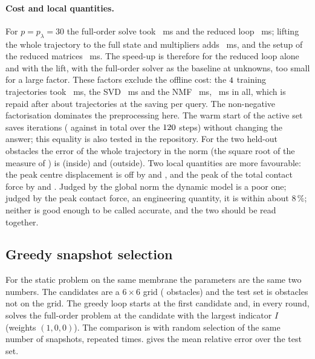 \paragraph{Cost and local quantities.} For $p=p_\lambda=30$ the full-order solve took \chdTimeFom~ms and the reduced loop \chdTimeRom~ms; lifting the whole trajectory to the full state and multipliers adds \chdTimeLift~ms, and the setup of the reduced matrices \chdTimeSetup~ms. The speed-up is therefore \chdSpeed{} for the reduced loop alone and \chdSpeedLift{} with the lift, with the full-order solver as the baseline at \chdN{} unknowns, too small for a large factor. These factors exclude the offline cost: the $4$ training trajectories took \chdTimeTrajs~ms, the SVD \chdTimeSvd~ms and the NMF \chdTimeNmf~ms, \chdTimeOffline~ms in all, which is repaid after about \chdBreakEven{} trajectories at the saving per query. The non-negative factorisation dominates the preprocessing here. The warm start of the active set saves iterations (\chdItersWarm{} against \chdItersCold{} in total over the $120$ steps) without changing the answer; this equality is also tested in the repository. For the two held-out obstacles the error of the whole trajectory in the norm (the square root of the measure of ) is \chdGlobalIn{} (inside) and \chdGlobalOut{} (outside). Two local quantities are more favourable: the peak centre displacement is off by \chdPeakDispIn{} and \chdPeakDispOut, and the peak of the total contact force by \chdPeakForceIn{} and \chdPeakForceOut. Judged by the global norm the dynamic model is a poor one; judged by the peak contact force, an engineering quantity, it is within about $8\,\%$; neither is good enough to be called accurate, and the two should be read together.

\subsection{Greedy snapshot selection}

For the static problem on the same membrane the parameters are the same two numbers. The candidates are a $6\times6$ grid (\cgrNCand{} obstacles) and the test set is \cgrNTest{} obstacles not on the grid. The greedy loop starts at the first candidate and, in every round, solves the full-order problem at the candidate with the largest indicator $I$ (weights $(1,0,0)$). The comparison is with random selection of the same number of snapshots, repeated \cgrNRand{} times.  gives the mean relative error over the test set.

